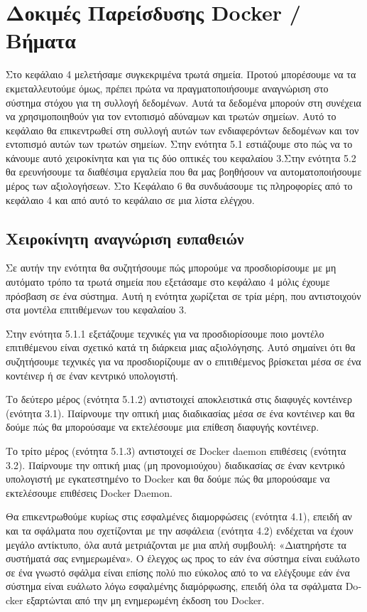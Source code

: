 \chapter{Δοκιμές Παρείσδυσης \textlatin{Docker} / Βήματα}
\label{dockerPenTesting}

Στο κεφάλαιο 4 μελετήσαμε συγκεκριμένα τρωτά σημεία. Προτού μπορέσουμε να τα
εκμεταλλευτούμε όμως, πρέπει πρώτα να πραγματοποιήσουμε αναγνώριση στο
σύστημα στόχου για τη συλλογή δεδομένων. Αυτά τα δεδομένα μπορούν στη συνέχεια
να χρησιμοποιηθούν για τον εντοπισμό αδύναμων και τρωτών σημείων. Αυτό το
κεφάλαιο θα επικεντρωθεί στη συλλογή αυτών των ενδιαφερόντων δεδομένων και τον
εντοπισμό αυτών των τρωτών σημείων. Στην ενότητα 5.1 εστιάζουμε στο πώς να το
κάνουμε αυτό χειροκίνητα και για τις δύο οπτικές του κεφαλαίου 3.Στην ενότητα
5.2 θα ερευνήσουμε τα διαθέσιμα εργαλεία που θα μας βοηθήσουν να
αυτοματοποιήσουμε μέρος των αξιολογήσεων. Στο Κεφάλαιο 6 θα συνδυάσουμε τις
πληροφορίες από το κεφάλαιο 4 και από αυτό το κεφάλαιο σε μια λίστα ελέγχου.

\section{Χειροκίνητη αναγνώριση ευπαθειών}

Σε αυτήν την ενότητα θα συζητήσουμε πώς μπορούμε να προσδιορίσουμε με μη
αυτόματο τρόπο τα τρωτά σημεία που εξετάσαμε στο κεφάλαιο 4 μόλις έχουμε
πρόσβαση σε ένα σύστημα. Αυτή η ενότητα χωρίζεται σε τρία μέρη, που
αντιστοιχούν στα μοντέλα επιτιθέμενων του κεφαλαίου 3.

Στην ενότητα 5.1.1 εξετάζουμε τεχνικές για να προσδιορίσουμε ποιο μοντέλο
επιτιθέμενου είναι σχετικό κατά τη διάρκεια μιας αξιολόγησης. Αυτό σημαίνει ότι
θα συζητήσουμε τεχνικές για να προσδιορίζουμε αν ο επιτιθέμενος βρίσκεται μέσα
σε ένα κοντέινερ ή σε έναν κεντρικό υπολογιστή.

Το δεύτερο μέρος (ενότητα 5.1.2) αντιστοιχεί αποκλειστικά στις διαφυγές
κοντέινερ (ενότητα 3.1). Παίρνουμε την οπτική μιας διαδικασίας μέσα σε ένα
κοντέινερ και θα δούμε πώς θα μπορούσαμε να εκτελέσουμε μια επίθεση διαφυγής
κοντέινερ.

Το τρίτο μέρος (ενότητα 5.1.3) αντιστοιχεί σε \textlatin{Docker daemon}
επιθέσεις (ενότητα 3.2). Παίρνουμε την οπτική μιας (μη προνομιούχου) διαδικασίας
σε έναν κεντρικό υπολογιστή με εγκατεστημένο το \textlatin{Docker} και θα δούμε
πώς θα μπορούσαμε να εκτελέσουμε επιθέσεις \textlatin{Docker Daemon}.

Θα επικεντρωθούμε κυρίως στις εσφαλμένες διαμορφώσεις (ενότητα 4.1), επειδή
αν και τα σφάλματα που σχετίζονται με την ασφάλεια (ενότητα 4.2) ενδέχεται να
έχουν μεγάλο αντίκτυπο, όλα αυτά μετριάζονται με μια απλή συμβουλή:
«Διατηρήστε τα συστήματά σας ενημερωμένα». Ο έλεγχος ως προς το εάν ένα σύστημα
είναι ευάλωτο σε ένα γνωστό σφάλμα είναι επίσης πολύ πιο εύκολος από το να
ελέγξουμε εάν ένα σύστημα είναι ευάλωτο λόγω εσφαλμένης διαμόρφωσης, επειδή όλα
τα σφάλματα \textlatin{Docker} εξαρτώνται από την μη ενημερωμένη έκδοση του
\textlatin{Docker}.

